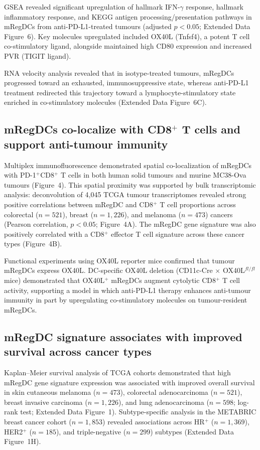 \documentclass[11pt]{article}
\begin{document}
GSEA revealed significant upregulation of hallmark IFN-$\gamma$ response, hallmark inflammatory response, and KEGG antigen processing/presentation pathways in mRegDCs from anti-PD-L1-treated tumours (adjusted $p < 0.05$; Extended Data Figure~6). Key molecules upregulated included OX40L (Tnfsf4), a potent T cell co-stimulatory ligand, alongside maintained high CD80 expression and increased PVR (TIGIT ligand).

RNA velocity analysis revealed that in isotype-treated tumours, mRegDCs progressed toward an exhausted, immunosuppressive state, whereas anti-PD-L1 treatment redirected this trajectory toward a lymphocyte-stimulatory state enriched in co-stimulatory molecules (Extended Data Figure~6C).

\subsection{mRegDCs co-localize with CD8$^{+}$ T cells and support anti-tumour immunity}

Multiplex immunofluorescence demonstrated spatial co-localization of mRegDCs with PD-1$^{+}$CD8$^{+}$ T cells in both human solid tumours and murine MC38-Ova tumours (Figure~4). This spatial proximity was supported by bulk transcriptomic analysis: deconvolution of 4,045 TCGA tumour transcriptomes revealed strong positive correlations between mRegDC and CD8$^{+}$ T cell proportions across colorectal ($n = 521$), breast ($n = 1,226$), and melanoma ($n = 473$) cancers (Pearson correlation, $p < 0.05$; Figure~4A). The mRegDC gene signature was also positively correlated with a CD8$^{+}$ effector T cell signature across these cancer types (Figure~4B).

Functional experiments using OX40L reporter mice confirmed that tumour mRegDCs express OX40L. DC-specific OX40L deletion (CD11c-Cre $\times$ OX40L$^{fl/fl}$ mice) demonstrated that OX40L$^{+}$ mRegDCs augment cytolytic CD8$^{+}$ T cell activity, supporting a model in which anti-PD-L1 therapy enhances anti-tumour immunity in part by upregulating co-stimulatory molecules on tumour-resident mRegDCs.

\subsection{mRegDC signature associates with improved survival across cancer types}

Kaplan--Meier survival analysis of TCGA cohorts demonstrated that high mRegDC gene signature expression was associated with improved overall survival in skin cutaneous melanoma ($n = 473$), colorectal adenocarcinoma ($n = 521$), breast invasive carcinoma ($n = 1,226$), and lung adenocarcinoma ($n = 598$; log-rank test; Extended Data Figure~1). Subtype-specific analysis in the METABRIC breast cancer cohort ($n = 1,853$) revealed associations across HR$^{+}$ ($n = 1,369$), HER2$^{+}$ ($n = 185$), and triple-negative ($n = 299$) subtypes (Extended Data Figure~1H).
\end{document}
